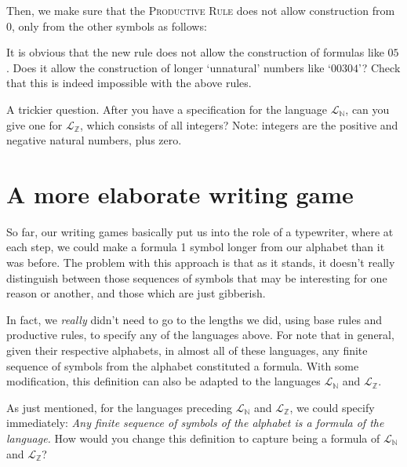 Then, we make sure that the \textsc{Productive Rule} does not allow construction from $0$, only from the other symbols as follows: 


\begin{exc}
It is obvious that the new rule does not allow the construction of formulas like $05$. Does it allow the construction of longer `unnatural' numbers like `$00304$'? Check that this is indeed impossible with the above rules. 
\end{exc}

\begin{exc}
A trickier question. After you have a specification for the language $\mathcal{L}_\mathbb{N}$, can you give one for $\mathcal{L}_\mathbb{Z}$, which consists of all integers? Note: integers are the positive and negative natural numbers, plus zero. 
\end{exc}

\section{A more elaborate writing game}

So far, our writing games basically put us into the role of a typewriter, where at each step, we could make a formula 1 symbol longer from our alphabet than it was before. The problem with this approach is that as it stands, it doesn't really distinguish between those sequences of symbols that may be interesting for one reason or another, and those which are just gibberish.

In fact, we \textit{really} didn't need to go to the lengths we did, using base rules and productive rules, to specify any of the languages above. For note that in general, given their respective alphabets, in almost all of these languages, any finite sequence of symbols from the alphabet constituted a formula. With some modification, this definition can also be adapted to the languages $\mathcal{L}_\mathbb{N}$ and $\mathcal{L}_\mathbb{Z}$. 

\begin{exc}
As just mentioned, for the languages preceding $\mathcal{L}_\mathbb{N}$ and $\mathcal{L}_\mathbb{Z}$, we could specify immediately: \textit{Any finite sequence of symbols of the alphabet is a formula of the language.} How would you change this definition to capture being a formula of $\mathcal{L}_\mathbb{N}$ and $\mathcal{L}_\mathbb{Z}$? 
\end{exc}

